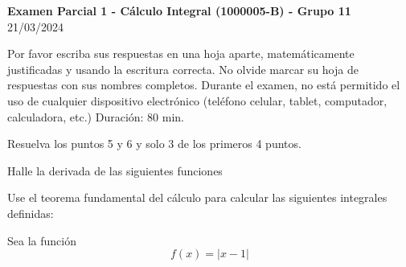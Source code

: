 \documentclass{exam}
\begin{document}
\begin{center}
{\bf Examen Parcial 1 - Cálculo Integral (1000005-B) - Grupo 11}\\
 21/03/2024
\end{center}
Por favor escriba sus respuestas en una hoja aparte, matemáticamente justificadas y usando la escritura correcta. No olvide marcar su hoja de respuestas con sus nombres completos. Durante el examen, no está permitido el uso de cualquier dispositivo electrónico (teléfono celular, tablet, computador, calculadora, etc.) Duración: 80 min.

Resuelva los puntos 5 y 6 y solo 3 de los primeros 4 puntos.

\begin{questions}

	  	\question [1]
  	Halle la derivada de las siguientes funciones
  	
  	\question [1]
  	Use el teorema fundamental del cálculo para calcular las siguientes integrales definidas:
  	
  	    \question [1]
    Sea la función
    $$
    f(x) = |x-1|
    $$
    

\end{questions}
\end{document}

